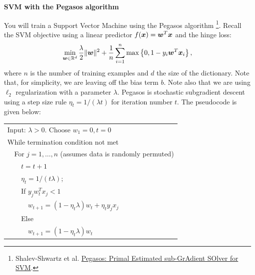 \documentclass{article}
\newcommand{\nyuparagrah}[1]{\textcolor{nyupurple}{\large #1}}
\theoremstyle{plain}
\theoremstyle{definition}
\begin{document}
\nyuparagrah{\bf SVM with the Pegasos algorithm}

You will train a Support Vector Machine using the Pegasos algorithm
\footnote{Shalev-Shwartz et al. \href{http://ttic.uchicago.edu/~nati/Publications/PegasosMPB.pdf}{Pegasos: Primal Estimated sub-GrAdient SOlver for SVM}.}.
Recall the SVM objective using a linear predictor $f(\boldsymbol{x}) = \boldsymbol{w} ^T \boldsymbol{x}$ and the hinge loss:
\[
\min_{\boldsymbol{w}\in\mathbb{R}^{d}}\frac{\lambda}{2}\|\boldsymbol{w}\|^{2}+\frac{1}{n}\sum_{i=1}^{n}\max\left\{ 0,1-y_{i}\boldsymbol{w}^{T}\boldsymbol{x}_{i}\right\} ,
\]
where $n$ is the number of training examples and $d$ the size of the dictionary.
Note that, for simplicity, we are leaving off the 
bias
term $b$. Note also that we are using $\ell_2$ regularization with a parameter $\lambda$. Pegasos is stochastic subgradient descent using a step
size rule $\eta_{t}=1/\left(\lambda t\right)$ for iteration number $t$. The pseudocode is
given below:
\begin{center}
\begin{tabular}{l}
\hline 
Input: $\lambda>0$. Choose $w_{1}=0,t=0$\tabularnewline
While termination condition not met\tabularnewline
\ \ For $j=1,\ldots,n$ (assumes data is randomly permuted)\tabularnewline
\ \ \ \ $t=t+1$\tabularnewline
\ \ \ \ $\eta_{t}=1/\left(t\lambda\right)$;\tabularnewline
\ \ \ \ If $y_{j}w_{t}^{T}x_{j}<1$\tabularnewline
\ \ \ \ \ \ $w_{t+1}=(1-\eta_{t}\lambda)w_{t}+\eta_{t}y_{j}x_{j}$\tabularnewline
\ \ \ \ Else \tabularnewline
\ \ \ \ \ \ $w_{t+1}=(1-\eta_{t}\lambda)w_{t}$\tabularnewline
\hline 
\end{tabular}
\par\end{center}
\end{document}
